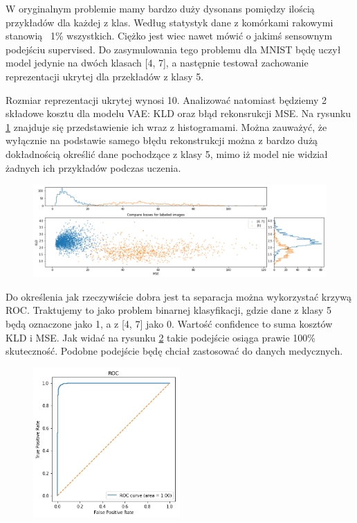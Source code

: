 W oryginalnym problemie mamy bardzo duży dysonans pomiędzy ilością przykładów dla każdej z klas. Według statystyk dane z komórkami rakowymi stanowią ~1\% wszystkich. Ciężko jest wiec nawet mówić o jakimś sensownym podejściu supervised. Do zasymulowania tego problemu dla MNIST będę uczył model jedynie na dwóch klasach [4, 7], a następnie testował zachowanie reprezentacji ukrytej dla przekładów z klasy 5.

Rozmiar reprezentacji ukrytej wynosi 10. Analizować natomiast będziemy 2 składowe kosztu dla modelu VAE: KLD oraz błąd rekonsrukcji MSE. Na rysunku \ref{fig:mnist_compare} znajduje się przedstawienie ich wraz z histogramami. Można zauważyć, że wyłącznie na podstawie samego błędu rekonstrukcji można z bardzo dużą dokładnością określić dane pochodzące z klasy 5, mimo iż model nie widział żadnych ich przykładów podczas uczenia.

\begin{figure}[h!]
    \centering
    \includegraphics[width=1.0\textwidth]{images/mnist_compare}
    \caption{}
    \label{fig:mnist_compare}
\end{figure}

Do określenia jak rzeczywiście dobra jest ta separacja można wykorzystać krzywą ROC. Traktujemy to jako problem binarnej klasyfikacji, gdzie dane z klasy 5 będą oznaczone jako 1, a z [4, 7] jako 0. Wartość confidence to suma kosztów KLD i MSE. Jak widać na rysunku \ref{fig:mnist_roc} takie podejście osiąga prawie 100\% skuteczność. Podobne podejście będę chciał zastosować do danych medycznych.

\begin{figure}[h!]
    \centering
    \includegraphics[width=0.5\textwidth]{images/mnist_roc}
    \caption{}
    \label{fig:mnist_roc}
\end{figure}

